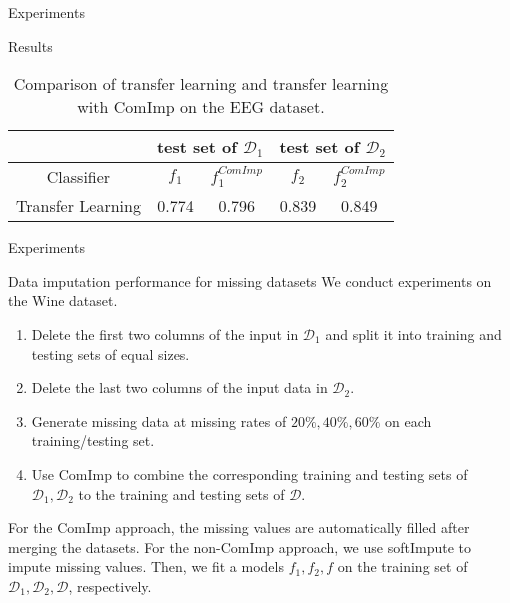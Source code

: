 \documentclass[xcolor={dvipsnames}]{beamer} %
\begin{document}
\begin{frame}{Experiments}
    \begin{block}{Results}
        \begin{table}[htbp]
        \caption{Comparison of transfer learning and transfer learning with ComImp on the EEG dataset.}
\label{tab-eeg}
\begin{center}
\begin{tabular}{|c|c|c|c|c|}
\hline
\multicolumn{1}{|c|}{}& \multicolumn{2}{|c|}{\bf test set of $\mathcal{D}_1$}  &\multicolumn{2}{|c|}{\bf test set of $\mathcal{D}_2$}
\\ \hline  
\multicolumn{1}{|c|}{Classifier}& \multicolumn{1}{|c|}{\bf ${f}_1$}  &\multicolumn{1}{|c|}{\bf $f^{ComImp}_{1}$} &\multicolumn{1}{|c|}{\bf ${f}_2$} &\multicolumn{1}{|c|}{\bf $f^{ComImp}_{2}$}
\\ \hline 
Transfer Learning & 0.774 & 0.796 & 0.839  & 0.849 \\
\hline 
\end{tabular}
\end{center}
        \end{table}
    \end{block}
\end{frame}
\begin{frame}{Experiments}
    \begin{block}{Data imputation performance for missing datasets}
    We conduct experiments on the Wine dataset. 
    \begin{enumerate}
        \item Delete the first two columns of the input in $\mathcal{D}_1$ and split it into training and testing sets of equal sizes.
        \item Delete the last two columns of the input data in $\mathcal{D}_2$.
        \item Generate missing data at missing rates of $20\%, 40\%, 60\%$ on each training/testing set.
        \item Use ComImp to combine the corresponding training and testing sets of $\mathcal{D}_1, \mathcal{D}_2$ to the training and testing sets of $\mathcal{D}$. 
    \end{enumerate}
For the ComImp approach, the missing values are automatically filled after merging the datasets. For the non-ComImp approach, we use softImpute to impute missing values. Then, we fit a models $f_1, f_2, f$ on the training set of $\mathcal{D}_1, \mathcal{D}_2, \mathcal{D}$, respectively.
    \end{block}
\end{frame}
\end{document}
